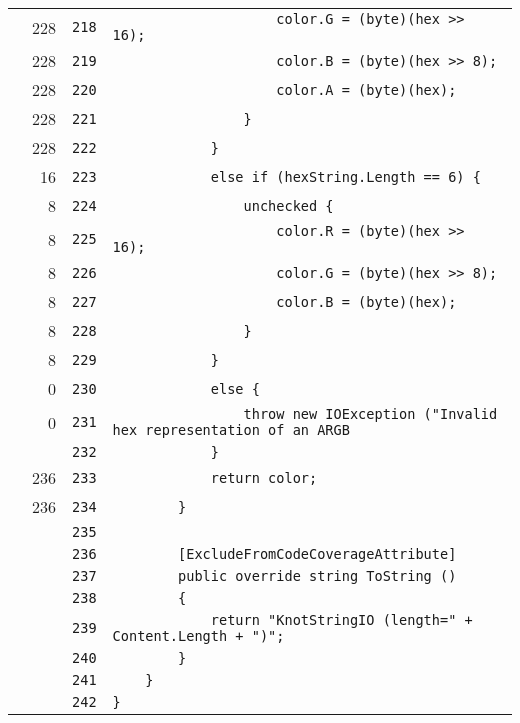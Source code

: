 \documentclass[a4paper,10pt]{article}
\begin{document}
\begin{longtable}[l]{lrrl}
\cellcolor{green} & 228 & \verb~218~ & \verb~                    color.G = (byte)(hex >> 16);~\\
\cellcolor{green} & 228 & \verb~219~ & \verb~                    color.B = (byte)(hex >> 8);~\\
\cellcolor{green} & 228 & \verb~220~ & \verb~                    color.A = (byte)(hex);~\\
\cellcolor{green} & 228 & \verb~221~ & \verb~                }~\\
\cellcolor{green} & 228 & \verb~222~ & \verb~            }~\\
\cellcolor{green} & 16 & \verb~223~ & \verb~            else if (hexString.Length == 6) {~\\
\cellcolor{green} & 8 & \verb~224~ & \verb~                unchecked {~\\
\cellcolor{green} & 8 & \verb~225~ & \verb~                    color.R = (byte)(hex >> 16);~\\
\cellcolor{green} & 8 & \verb~226~ & \verb~                    color.G = (byte)(hex >> 8);~\\
\cellcolor{green} & 8 & \verb~227~ & \verb~                    color.B = (byte)(hex);~\\
\cellcolor{green} & 8 & \verb~228~ & \verb~                }~\\
\cellcolor{green} & 8 & \verb~229~ & \verb~            }~\\
\cellcolor{red} & 0 & \verb~230~ & \verb~            else {~\\
\cellcolor{red} & 0 & \verb~231~ & \verb~                throw new IOException ("Invalid hex representation of an ARGB ~\\
\cellcolor{gray} &  & \verb~232~ & \verb~            }~\\
\cellcolor{green} & 236 & \verb~233~ & \verb~            return color;~\\
\cellcolor{green} & 236 & \verb~234~ & \verb~        }~\\
\cellcolor{gray} &  & \verb~235~ & \verb~~\\
\cellcolor{gray} &  & \verb~236~ & \verb~        [ExcludeFromCodeCoverageAttribute]~\\
\cellcolor{gray} &  & \verb~237~ & \verb~        public override string ToString ()~\\
\cellcolor{gray} &  & \verb~238~ & \verb~        {~\\
\cellcolor{gray} &  & \verb~239~ & \verb~            return "KnotStringIO (length=" + Content.Length + ")";~\\
\cellcolor{gray} &  & \verb~240~ & \verb~        }~\\
\cellcolor{gray} &  & \verb~241~ & \verb~    }~\\
\cellcolor{gray} &  & \verb~242~ & \verb~}~\\
\end{longtable}
\newpage
\end{document}
